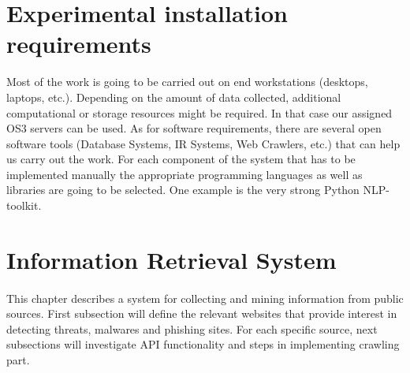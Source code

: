 \documentclass[12pt]{article}
\begin{document}
\section{Experimental installation requirements}
\parbox{\linewidth}{
Most of the work is going to be carried out on end workstations (desktops, laptops, etc.). Depending on the amount of data collected, additional computational or storage resources might be required. In that case our assigned OS3 servers can be used. As for software requirements, there are several open software tools (Database Systems, IR Systems, Web Crawlers, etc.) that can help us carry out the work. For each component of the system that has to be implemented manually the appropriate programming languages as well as libraries are going to be selected. One example is the very strong Python NLP-toolkit.\cite{nltk} }

\newpage
\section{Information Retrieval System}
\parbox{\linewidth}{
\paragraph{}
This chapter describes a system for collecting and mining information from public sources. First subsection will define the relevant websites that provide interest in detecting threats, malwares and phishing sites. For each specific source, next subsections will investigate API functionality and steps in implementing crawling part. 
}
\end{document}
